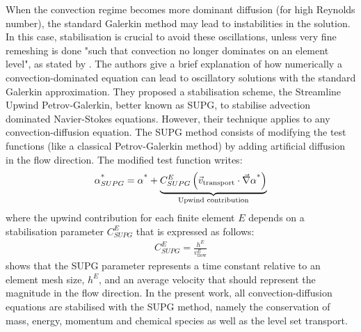 When the convection regime becomes more dominant diffusion (for high Reynolds number), the standard Galerkin method may lead to instabilities in
the solution. In this case, stabilisation is crucial to avoid these oscillations, unless very fine remeshing is done "such that
convection no longer dominates on an element level", as stated by \citet{brooks_streamline_1982}.
The authors give a brief explanation of how numerically a convection-dominated equation can lead to oscillatory solutions with
the standard Galerkin approximation.
They proposed a stabilisation scheme, the Streamline Upwind Petrov-Galerkin, better known as SUPG, to stabilise advection dominated
Navier-Stokes equations. However, their technique applies to any convection-diffusion equation.
The SUPG method consists of modifying the test functions (like a classical Petrov-Galerkin method) by adding artificial
diffusion in the flow direction. The modified test function writes:
\begin{align}
\label{eq:testfuntion_supg}
\alpha_{SUPG}^\text{*} = \alpha^\text{*} + \underbrace{C^E_{SUPG} \left( \vec{v}_\text{transport} \cdot \vec{\nabla} \alpha^\text{*} \right)}_{\text{Upwind contribution}}
\end{align}
where the upwind contribution for each finite element $E$ depends on a stabilisation parameter $C^E_{SUPG}$ that is expressed as follows:
\begin{align}
\label{eq:supg_constant}
C^E_{SUPG} = \frac{h^E}{v^E_\text{flow}}
\end{align}
 shows that the SUPG parameter represents a time 
constant relative to an element mesh size, $h^E$, and an average velocity
that should represent the magnitude in the flow direction.
In the present work, all convection-diffusion equations are stabilised with the SUPG method, 
namely the conservation of mass, energy, momentum and chemical species as well as the level set transport.
%
